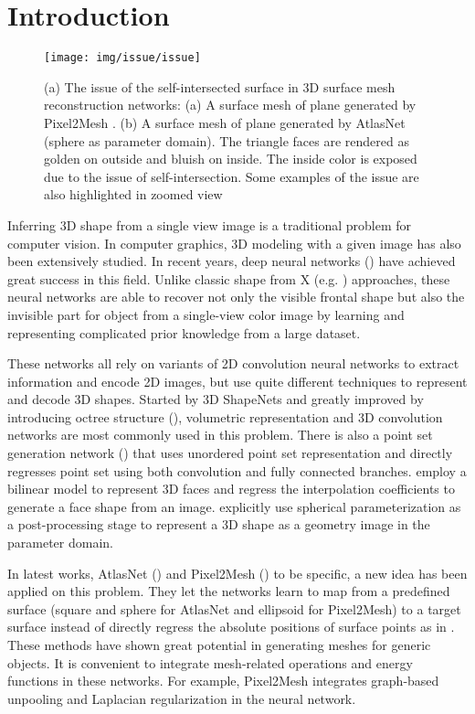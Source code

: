 \section{Introduction}
\begin{figure}[htbp]
	\centering
	\texttt{[image: img/issue/issue]}
	\caption{(a) The issue of the self-intersected surface in 3D surface mesh reconstruction networks: (a) A surface mesh of plane generated by Pixel2Mesh \cite{pixel2mesh}. (b) A surface mesh of plane generated by AtlasNet \cite{atlasnet}(sphere as parameter domain). The triangle faces are rendered as golden on outside and bluish on inside. The inside color is exposed due to the issue of self-intersection. Some examples of the issue are also highlighted in zoomed view}
	\label{fig:issue}
\end{figure}
Inferring 3D shape from a single view image is a traditional problem for computer vision. In computer graphics, 3D modeling with a given image has also been extensively studied. In recent years, deep neural networks (\cite{3DR2N2,PSGN,3Drender,imgrecon15,3dshapenet,endface,octreegen,surfnet,shapeprior}) have achieved great success in this field. Unlike classic shape from X (e.g. \cite{shapefromshading,shapefromtext1,shapefromtext2}) approaches, these neural networks are able to recover not only the visible frontal shape but also the invisible part for object from a single-view color image by learning and representing complicated prior knowledge from a large dataset. 

These networks all rely on variants of 2D convolution neural networks to extract information and encode 2D images, but use quite different techniques to represent and decode 3D shapes. Started by 3D ShapeNets \cite{3dshapenet} and greatly improved by introducing octree structure (\cite{octreegen}), volumetric representation and 3D convolution networks are most commonly used in this problem. There is also a point set generation network (\cite{PSGN}) that uses unordered point set representation and directly regresses point set using both convolution and fully connected branches. \cite{endface} employ a bilinear model to represent 3D faces and regress the interpolation coefficients to generate a face shape from an image. \cite{surfnet} explicitly use spherical parameterization as a post-processing stage to represent a 3D shape as a geometry image in the parameter domain. 

In latest works, AtlasNet (\cite{atlasnet}) and Pixel2Mesh (\cite{pixel2mesh}) to be specific, a new idea has been applied on this problem. They let the networks learn to map from a predefined surface (square and sphere for AtlasNet and ellipsoid for Pixel2Mesh) to a target surface instead of directly regress the absolute positions of surface points as in \cite{PSGN}. These methods have shown great potential in generating meshes for generic objects. It is convenient to integrate mesh-related operations and energy functions in these networks. For example, Pixel2Mesh integrates graph-based unpooling and Laplacian regularization in the neural network.

